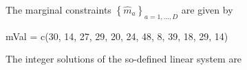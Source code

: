 \documentclass[
]{article}
\newenvironment{Shaded}{\begin{snugshade}}{\end{snugshade}}
\newcommand{\DecValTok}[1]{\textcolor[rgb]{0.00,0.00,0.81}{#1}}
\newcommand{\FunctionTok}[1]{\textcolor[rgb]{0.00,0.00,0.00}{#1}}
\newcommand{\NormalTok}[1]{#1}
\newcommand{\OtherTok}[1]{\textcolor[rgb]{0.56,0.35,0.01}{#1}}
\begin{document}
The marginal constraints \(\left\{ \widehat m_a\right\}_{a=1,...,D}\)
are given by

\begin{Shaded}
\begin{Highlighting}[]
\NormalTok{mVal }\OtherTok{=} \FunctionTok{c}\NormalTok{(}\DecValTok{30}\NormalTok{, }\DecValTok{14}\NormalTok{, }\DecValTok{27}\NormalTok{, }\DecValTok{29}\NormalTok{, }\DecValTok{20}\NormalTok{, }\DecValTok{24}\NormalTok{, }\DecValTok{48}\NormalTok{, }\DecValTok{8}\NormalTok{, }\DecValTok{39}\NormalTok{, }\DecValTok{18}\NormalTok{, }\DecValTok{29}\NormalTok{, }\DecValTok{14}\NormalTok{)}
\end{Highlighting}
\end{Shaded}

The integer solutions of the so-defined linear system are
\end{document}

